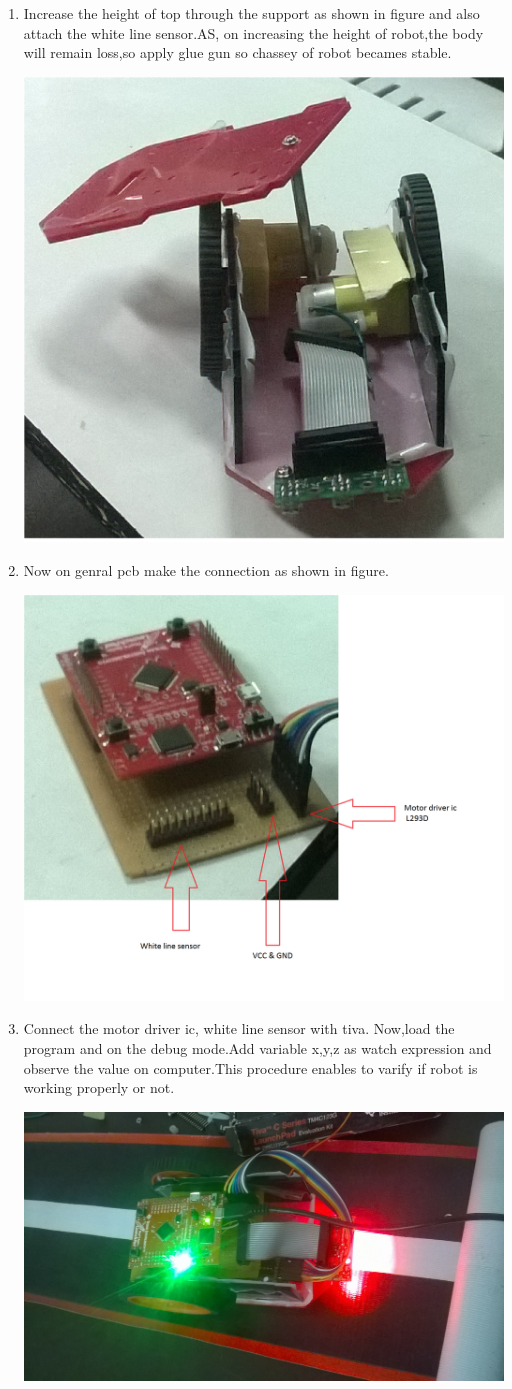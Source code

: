 \documentclass[a4paper,12pt,oneside]{book}
\begin{document}
\begin{enumerate}
\item Increase the height of top through the support as shown in figure and also attach the white line sensor.AS, on increasing the height of robot,the body will remain loss,so apply glue gun so chassey of robot becames stable.

\includegraphics[width=400 px]{img6.png}



\item Now on genral pcb make the connection as shown in figure.

\includegraphics[width=300 px]{pcb.png}

\item Connect the motor driver ic, white line sensor with tiva. Now,load the program and on the debug mode.Add variable x,y,z as watch expression and observe the value on computer.This procedure enables to varify if robot is working properly or not. 

\includegraphics[width=400 px]{calibration.jpg}


\end{enumerate}
\end{document}
